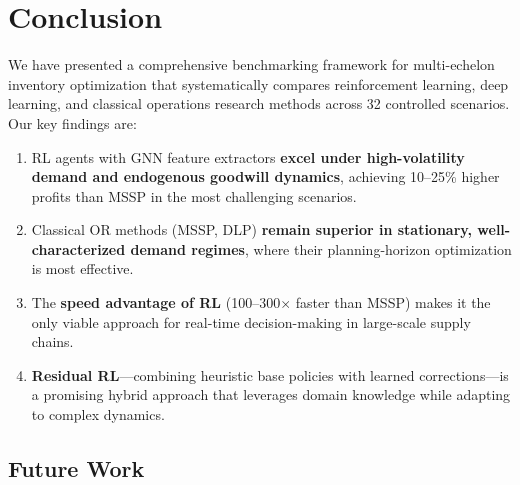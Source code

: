 \documentclass[preprint,12pt]{elsarticle}
\begin{document}
\section{Conclusion}\label{sec:conclusion}

We have presented a comprehensive benchmarking framework for multi-echelon
inventory optimization that systematically compares reinforcement learning,
deep learning, and classical operations research methods across 32
controlled scenarios. Our key findings are:

\begin{enumerate}
  \item RL agents with GNN feature extractors \textbf{excel under
        high-volatility demand and endogenous goodwill dynamics}, achieving
        10--25\% higher profits than MSSP in the most challenging scenarios.

  \item Classical OR methods (MSSP, DLP) \textbf{remain superior in
        stationary, well-characterized demand regimes}, where their
        planning-horizon optimization is most effective.

  \item The \textbf{speed advantage of RL} (100--300$\times$ faster than
        MSSP) makes it the only viable approach for real-time
        decision-making in large-scale supply chains.

  \item \textbf{Residual RL}---combining heuristic base policies with
        learned corrections---is a promising hybrid approach that
        leverages domain knowledge while adapting to complex dynamics.
\end{enumerate}

\subsection{Future Work}
\end{document}

